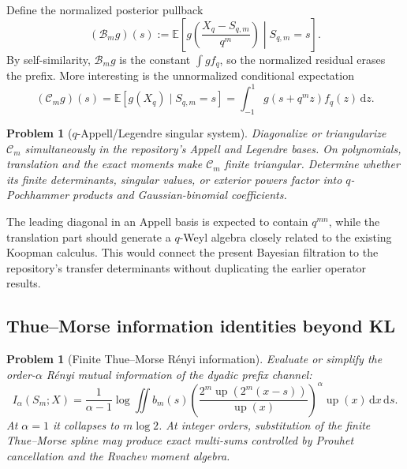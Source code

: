 \documentclass[11pt,oneside]{article}
\newtheorem{problem}[theorem]{Problem}
\theoremstyle{definition}
\theoremstyle{remark}
\newcommand{\E}{\mathbb E}
\newcommand{\Up}{\operatorname{up}}
\newcommand{\dd}{\,\mathrm d}
\begin{document}
Define the normalized posterior pullback
\begin{equation}
 (\mathcal B_mg)(s)
 :=\E\left[g\!\left(\frac{X_q-S_{q,m}}{q^m}\right)
       \middle|S_{q,m}=s\right].
 \label{eq:Bayesian-operator}
\end{equation}
By self-similarity, $\mathcal B_mg$ is the constant $\int g f_q$, so the
normalized residual erases the prefix.  More interesting is the unnormalized
conditional expectation
\begin{equation}
 (\mathcal C_mg)(s)=\E[g(X_q)\mid S_{q,m}=s]
 =\int_{-1}^{1}g(s+q^mz)f_q(z)\dd z.
 \label{eq:Cm}
\end{equation}

\begin{problem}[$q$-Appell/Legendre singular system]
\label{prob:Bayesian-spectrum}
Diagonalize or triangularize $\mathcal C_m$ simultaneously in the repository's
Appell and Legendre bases.  On polynomials, translation and the exact moments make
$\mathcal C_m$ finite triangular.  Determine whether its finite determinants,
singular values, or exterior powers factor into $q$-Pochhammer products and
Gaussian-binomial coefficients.
\end{problem}

The leading diagonal in an Appell basis is expected to contain $q^{mn}$, while the
translation part should generate a $q$-Weyl algebra closely related to the
existing Koopman calculus.  This would connect the present Bayesian filtration to
the repository's transfer determinants without duplicating the earlier operator
results.

\subsection{Thue--Morse information identities beyond KL}

\begin{problem}[Finite Thue--Morse R\'enyi information]
\label{prob:TM-Renyi}
Evaluate or simplify the order-$\alpha$ R\'enyi mutual information of the dyadic
prefix channel:
\begin{equation}
 I_\alpha(S_m;X)
 =\frac1{\alpha-1}
 \log\iint b_m(s)
 \left(\frac{2^m\Up(2^m(x-s))}{\Up(x)}\right)^{\alpha}
 \Up(x)\dd x\dd s.
 \label{eq:TM-Renyi}
\end{equation}
At $\alpha=1$ it collapses to $m\log2$.  At integer orders, substitution of the
finite Thue--Morse spline may produce exact multi-sums controlled by Prouhet
cancellation and the Rvachev moment algebra.
\end{problem}
\end{document}

